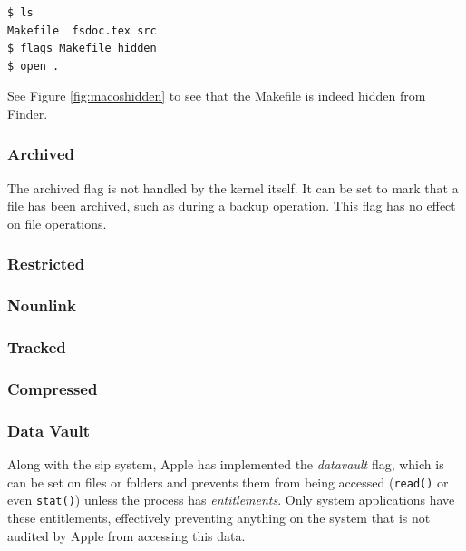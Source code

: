 \documentclass[a4paper]{article}
\begin{document}
\begin{verbatim}
$ ls
Makefile  fsdoc.tex src
$ flags Makefile hidden
$ open .
\end{verbatim}
See Figure \ref{fig:macoshidden} to see that the Makefile is indeed hidden from Finder.

\subsubsection{Archived}

The archived flag is not handled by the kernel itself. It can be set to mark that a file has been archived, such as during a backup operation. This flag has no effect on file operations.

\subsubsection{Restricted}

\subsubsection{Nounlink}

\subsubsection{Tracked}

\subsubsection{Compressed}

\subsubsection{Data Vault}


Along with the \gls{sip} system, Apple has implemented the \emph{datavault} flag, which is can be set on files or folders and prevents them from being accessed (\verb|read()| or even \verb|stat()|) unless the process has \emph{entitlements}. Only system applications have these entitlements, effectively preventing anything on the system that is not audited by Apple from accessing this data.
\end{document}
